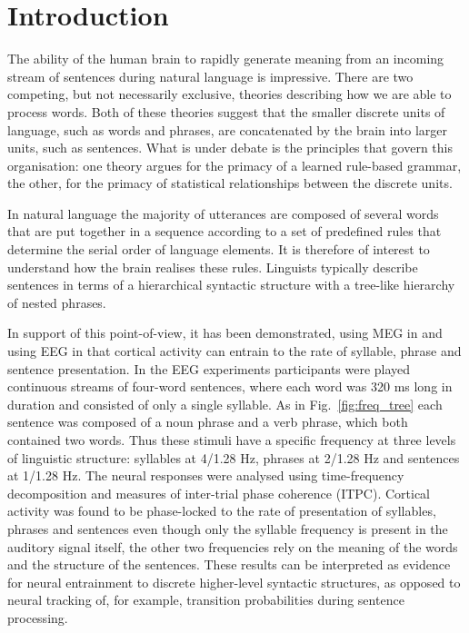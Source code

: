 \documentclass[a4paper,10pt,twoside]{article}
\begin{document}
\section{Introduction}



The ability of the human brain to rapidly generate meaning from an
incoming stream of sentences during natural language is
impressive. There are two competing, but not necessarily exclusive, theories describing how we are able to process words. Both
of these theories suggest that the smaller discrete units of language,
such as words and phrases, are concatenated by the brain into larger
units, such as sentences. What is under debate is the principles that
govern this organisation: one theory argues for the primacy of a
learned rule-based grammar, the other, for the primacy of statistical
relationships between the discrete units.

%
%

In natural language the majority of utterances are composed of several
words that are put together in a sequence according to a set of
predefined rules that determine the serial order of language
elements. It is therefore of interest to understand how the brain
realises these rules. Linguists typically describe sentences in terms
of a hierarchical syntactic structure with a tree-like hierarchy of
nested phrases.

In support of this point-of-view, it has been demonstrated, using MEG
in \cite{DingEtAl2016} and using EEG in \cite{DingEtAl2017} that
cortical activity can entrain to the rate of syllable, phrase and
sentence presentation. In the EEG experiments participants were played
continuous streams of four-word sentences, where each word was 320 ms
long in duration and consisted of only a single syllable. As in
Fig.~\ref{fig:freq_tree} each sentence was composed of a noun phrase
and a verb phrase, which both contained two words. Thus these stimuli
have a specific frequency at three levels of linguistic structure:
syllables at 4/1.28 Hz, phrases at 2/1.28 Hz and sentences at 1/1.28
Hz. The neural responses were analysed using time-frequency
decomposition and measures of inter-trial phase coherence
(ITPC). Cortical activity was found to be phase-locked to the rate of
presentation of syllables, phrases and sentences even though only the
syllable frequency is present in the auditory signal itself, the other two
frequencies rely on the meaning of the words and the structure of the
sentences.  These results can be interpreted as evidence for neural
entrainment to discrete higher-level syntactic structures, as opposed
to neural tracking of, for example, transition probabilities during
sentence processing.
\end{document}
